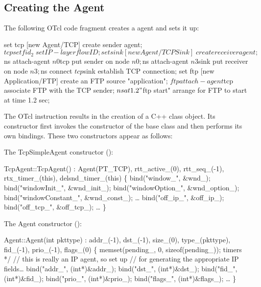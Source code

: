 \subsection{Creating the Agent}
\label{sec:createtcpsimple}

The following OTcl code fragment creates a  agent
and sets it up:
\begin{program}
        set tcp [new Agent/TCP]         \; create sender agent;
        $tcp set fid_ 2                 \; set IP-layer flow ID;
        set sink [new Agent/TCPSink]    \; create receiver agent;
        $ns attach-agent $n0 $tcp       \; put sender on node $n0;
        $ns attach-agent $n3 $sink      \; put receiver on node $n3;
        $ns connect $tcp $sink          \; establish TCP connection;
        set ftp [new Application/FTP]        \; create an FTP source "application";
        $ftp attach-agent $tcp            \; associate FTP with the TCP sender;
        $ns at 1.2 "$ftp start"  \;arrange for FTP to start at time 1.2 sec;
\end{program}
The OTcl instruction  results in the
creation of a C++  class object.
Its constructor first invokes the constructor of the
 base class and then performs its own bindings.
These two constructors appear as follows:
\begin{program}
{\rm The TcpSimpleAgent constructor ():}

        TcpAgent::TcpAgent() : Agent(PT_TCP), rtt_active_(0), rtt_seq_(-1),
                        rtx_timer_(this), delsnd_timer_(this)
        \{
                bind("window_", &wnd_);
                bind("windowInit_", &wnd_init_);
                bind("windowOption_", &wnd_option_);
                bind("windowConstant_", &wnd_const_);
                \ldots
                bind("off_ip_", &off_ip_);
                bind("off_tcp_", &off_tcp_);
                \ldots
        \}

{\rm The Agent constructor ():}

        Agent::Agent(int pkttype) : 
                addr_(-1), dst_(-1), size_(0), type_(pkttype), fid_(-1),
                prio_(-1), flags_(0)
        \{
                memset(pending_, 0, sizeof(pending_)); \* timers */
                // {\cf this is really an IP agent, so set up}
                // {\cf for generating the appropriate IP fields\ldots}
                bind("addr_", (int*)&addr_);
                bind("dst_", (int*)&dst_);
                bind("fid_", (int*)&fid_);
                bind("prio_", (int*)&prio_);
                bind("flags_", (int*)&flags_);
                \ldots
        \}
\end{program}
